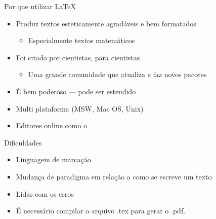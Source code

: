 \documentclass{beamer}
\subtitle{Parte 1: O básico}
\begin{document}
\begin{frame}
\titlepage
\end{frame}

\begin{frame}{Por que utilizar \LaTeX}

\begin{itemize}
  \item Produz  textos esteticamente agradáveis e bem formatados
  \begin{itemize}
  \item Especialmente textos matemáticos
\end{itemize}
  \item Foi criado por cientistas, para cientistas
  \begin{itemize}
  \item Uma grande comunidade que atualiza e faz novos pacotes
\end{itemize}
  \item É bem poderoso --- pode ser estendido
  \begin{itemize}
\end{itemize}
\item Multi plataforma (MSW, Mac OS, Unix)
\item Editores online como o \href{https://www.writelatex.com/signup?ref=9868d6ae68e9}{\wllogo}
\end{itemize}



\begin{block}{Dificuldades}
\begin{itemize}
  \item Linguagem de marcação
  \item Mudança de paradigma em relação a como se escreve um texto
  \item Lidar com os erros
  \item É necessário compilar o arquivo .tex para gerar o .pdf.
\end{itemize}
\end{block}

\end{frame}
\end{document}
